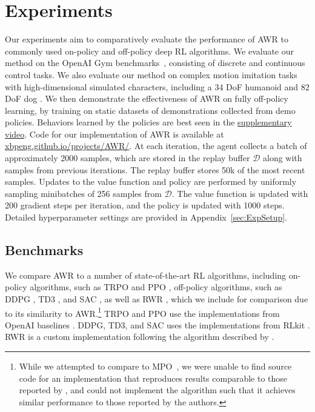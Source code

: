 \documentclass{article} \usepackage{iclr2020_conference,times}
\begin{document}
\section{Experiments}
\label{sec:Experiments}
Our experiments aim to comparatively evaluate the performance of AWR to commonly used on-policy and off-policy deep RL algorithms. We evaluate our method on the OpenAI Gym benchmarks~\citep{OpenAIGym}, consisting of discrete and continuous control tasks. We also evaluate our method on complex motion imitation tasks with high-dimensional simulated characters, including a 34 DoF humanoid and 82 DoF dog \citep{2018-TOG-deepMimic}. We then demonstrate the effectiveness of AWR on fully off-policy learning, by training on static datasets of demonstrations collected from demo policies. Behaviors learned by the policies are best seen in the \href{https://xbpeng.github.io/projects/AWR/}{supplementary video}.
Code for our implementation of AWR is available at \href{https://xbpeng.github.io/projects/AWR/}{xbpeng.github.io/projects/AWR/}. At each iteration, the agent collects a batch of approximately 2000 samples, which are stored in the replay buffer $\mathcal{D}$ along with samples from previous iterations. The replay buffer stores 50k of the most recent samples. Updates to the value function and policy are performed by uniformly sampling minibatches of 256 samples from $\mathcal{D}$. The value function is updated with 200 gradient steps per iteration, and the policy is updated with 1000 steps. Detailed hyperparameter settings are provided in Appendix~\ref{sec:ExpSetup}.

\subsection{Benchmarks}
We compare AWR to a number of state-of-the-art RL algorithms, including on-policy algorithms, such as TRPO \citep{TRPOschulman15} and PPO \citep{PPOSchulmanWDRK17}, off-policy algorithms, such as DDPG \citep{DDPG2016}, TD3 \citep{fujimoto18a}, and SAC \citep{SAC18}, as well as RWR \citep{Peters2007RWR}, which we include for comparison due to its similarity to AWR.\footnote{While we attempted to compare to MPO~\citep{abdolmaleki2018maximum}, we were unable to find source code for an implementation that reproduces results comparable to those reported by \citet{abdolmaleki2018maximum}, and could not implement the algorithm such that it achieves similar performance to those reported by the authors.}
TRPO and PPO use the implementations from OpenAI baselines \citep{baselines}. DDPG, TD3, and SAC uses the implementations from RLkit \citep{rlkit}. RWR is a custom implementation following the algorithm described by \citet{Peters2007RWR}.
\end{document}

